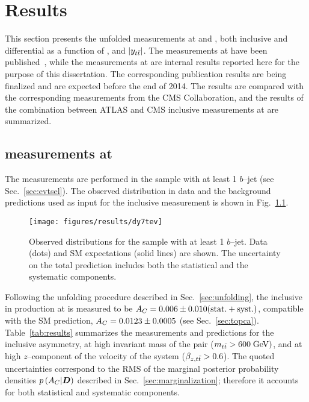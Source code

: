 \chapter{Results}
\label{sec:results}

This section presents the unfolded \ac{} measurements at \seventev{}
and \eighttev{}, both inclusive and differential as a function of \mtt{},
\pttt{} and $|y_{t\bar{t}}{}|$. The measurements at \seventev{} have been
published~\cite{Aad:2013cea}, while the measurements at \eighttev{}
are internal results reported here for the purpose of this
dissertation. The corresponding publication results are being
finalized and are expected before the end of 2014. The results are
compared with the corresponding measurements from the CMS
Collaboration, and the results of the combination between ATLAS and
CMS inclusive measurements at \seventev{} are summarized.

\section{\ac{} measurements at \seventev{}}
\label{sec:res7tev}

The measurements are performed in the \ljets{} sample with
at least 1 $b$--jet (see Sec.~\ref{sec:evtsel}). The observed \dy{}
distribution in data and the background predictions used as input for
the inclusive measurement is shown in Fig.~\ref{fig:dy7tev}.

\begin{figure}[!htb]\centering
  \texttt{[image: figures/results/dy7tev]} 
  \caption{Observed \dy{} distributions for the \ljets{}
    sample with at least 1 $b$--jet. Data (dots) and SM expectations
    (solid lines) are shown. The uncertainty on the total prediction
    includes both the statistical and the systematic components.}
  \label{fig:dy7tev}
\end{figure}

Following the unfolding procedure described in
Sec.~\ref{sec:unfolding}, the inclusive \ac{} in \ttbar{} production
at \seventev{} is measured to be $A_C{}=
0.006\pm0.010(\rm{stat.}+\rm{syst.})$, compatible with the SM
prediction, $A_C{}=0.0123\pm0.0005$ (see Sec.~\ref{sec:topca}).
Table~\ref{tab:results} summarizes the
measurements and predictions for the inclusive asymmetry, at high
invariant mass of the \ttbar{} pair ($m_{t\bar{t}}{} >600 \; \mathrm{GeV}{})$, and at
high $z$--component of the velocity of the \ttbar{} system ($\beta_{z,t\bar{t}}{}>0.6$).
The quoted uncertainties correspond to the RMS of the marginal posterior
probability densities $p\left(A_C{}|\boldsymbol{D}{}\right)$ described in
Sec.~\ref{sec:marginalization}; therefore it accounts for both
statistical and systematic components.

